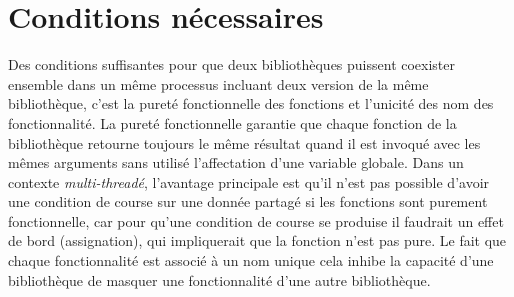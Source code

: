 \documentclass[12pt,initial,twoside,maitrise]{dms}
\numberwithin{equation}{section}
\numberwithin{table}{chapter}
\numberwithin{figure}{chapter}
\begin{document}






%
%


\section{Conditions nécessaires}%
Des conditions suffisantes pour que deux bibliothèques puissent coexister ensemble
dans un même processus incluant deux version de la même bibliothèque, c'est la pureté fonctionnelle des
fonctions et l'unicité des nom des fonctionnalité. La pureté fonctionnelle garantie
que chaque fonction de la bibliothèque retourne toujours le même résultat quand il
est invoqué avec les mêmes arguments sans utilisé l'affectation d'une variable globale.
Dans un contexte \textit{multi-threadé}, l'avantage principale est qu'il n'est pas possible
d'avoir une condition de course sur une donnée partagé si les fonctions sont purement fonctionnelle,
car pour qu'une condition de course se produise il faudrait un effet de bord (assignation), qui impliquerait
que la fonction n'est pas pure. Le fait que chaque fonctionnalité est associé à un nom unique cela inhibe
la capacité d'une bibliothèque de masquer une fonctionnalité d'une autre bibliothèque.
\end{document}
